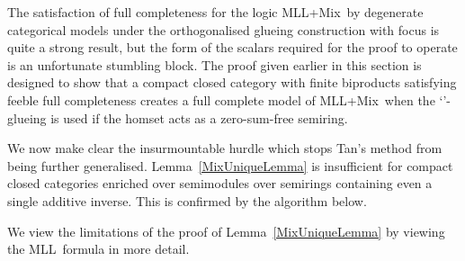 \documentclass{LMCS}
\theoremstyle{plain}\newtheorem*{cLm}{Claim}
\newcommand{\mll}{MLL} \newcommand{\mall}{MALL}
\newcommand{\mllmix}{MLL+Mix} \newcommand{\GRel}{\mathbf{GRel}}
\newcommand{\p}{} \newcommand{\N}{\mathbb{N}}
\begin{document}
    The satisfaction of full completeness for the logic \mllmix\ by degenerate categorical models under the orthogonalised glueing construction with focus  is quite a strong result, but the form of the scalars required for the proof to operate is an unfortunate stumbling block. The proof given earlier in this section is designed to show that a compact closed category with finite biproducts satisfying feeble full completeness creates a full complete model of \mllmix\ when the `'-glueing is used if the homset  acts as a zero-sum-free semiring.
    
    \p We now make clear the insurmountable hurdle which stops Tan's method from being further generalised. Lemma~\ref{MixUniqueLemma} is insufficient for compact closed categories enriched over semimodules over semirings containing even a single additive inverse. This is confirmed by the algorithm below.

    \begin{exa}
    We view the limitations of the proof of Lemma~\ref{MixUniqueLemma} by viewing the \mll~formula  in more detail.
    \end{exa}
    
\end{document}
